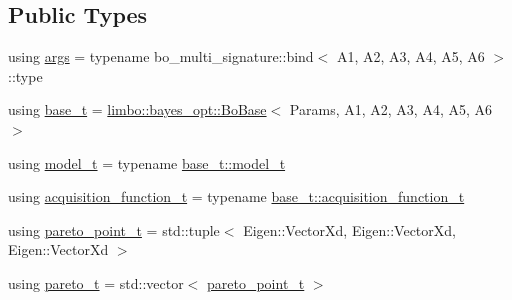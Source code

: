 \subsection*{Public Types}
\begin{DoxyCompactItemize}
\item 
using \hyperlink{classlimbo_1_1experimental_1_1bayes__opt_1_1_bo_multi_a9ab4aaa59b6c7495da8e0220622efdea}{args} = typename bo\+\_\+multi\+\_\+signature\+::bind$<$ A1, A2, A3, A4, A5, A6 $>$\+::type
\item 
using \hyperlink{classlimbo_1_1experimental_1_1bayes__opt_1_1_bo_multi_a96e3df5190731faf8d60b20d6810ba64}{base\+\_\+t} = \hyperlink{classlimbo_1_1bayes__opt_1_1_bo_base}{limbo\+::bayes\+\_\+opt\+::\+Bo\+Base}$<$ Params, A1, A2, A3, A4, A5, A6 $>$
\item 
using \hyperlink{classlimbo_1_1experimental_1_1bayes__opt_1_1_bo_multi_abc4fa6ff00e1bf591283e5a2739fb6c8}{model\+\_\+t} = typename \hyperlink{classlimbo_1_1bayes__opt_1_1_bo_base_a5e23d523dd2a16b866a2660721b937bb}{base\+\_\+t\+::model\+\_\+t}
\item 
using \hyperlink{classlimbo_1_1experimental_1_1bayes__opt_1_1_bo_multi_aa9e161c2d3b75329a8470204c32f1458}{acquisition\+\_\+function\+\_\+t} = typename \hyperlink{classlimbo_1_1bayes__opt_1_1_bo_base_a5abe502b49e1ee70d5e00f27f95f5dff}{base\+\_\+t\+::acquisition\+\_\+function\+\_\+t}
\item 
using \hyperlink{classlimbo_1_1experimental_1_1bayes__opt_1_1_bo_multi_a5592d2f8141fec88904c0f60beb7ff2d}{pareto\+\_\+point\+\_\+t} = std\+::tuple$<$ Eigen\+::\+Vector\+Xd, Eigen\+::\+Vector\+Xd, Eigen\+::\+Vector\+Xd $>$
\item 
using \hyperlink{classlimbo_1_1experimental_1_1bayes__opt_1_1_bo_multi_aba7172aa379e749ea5cb85c8773e6408}{pareto\+\_\+t} = std\+::vector$<$ \hyperlink{classlimbo_1_1experimental_1_1bayes__opt_1_1_bo_multi_a5592d2f8141fec88904c0f60beb7ff2d}{pareto\+\_\+point\+\_\+t} $>$
\end{DoxyCompactItemize}
